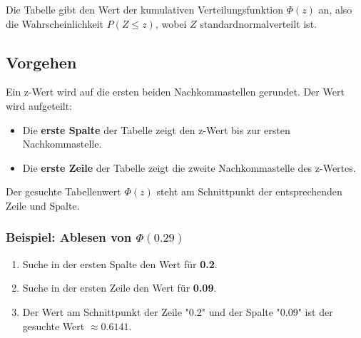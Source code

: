 Die Tabelle gibt den Wert der kumulativen Verteilungsfunktion \(\Phi(z)\) an, also die Wahrscheinlichkeit \(P(Z \le z)\), wobei \(Z\) standardnormalverteilt ist.

\subsection*{Vorgehen}
Ein z-Wert wird auf die ersten beiden Nachkommastellen gerundet. Der Wert wird aufgeteilt:
\begin{itemize}
    \item Die \textbf{erste Spalte} der Tabelle zeigt den z-Wert bis zur ersten Nachkommastelle.
    \item Die \textbf{erste Zeile} der Tabelle zeigt die zweite Nachkommastelle des z-Wertes.
\end{itemize}
Der gesuchte Tabellenwert \(\Phi(z)\) steht am Schnittpunkt der entsprechenden Zeile und Spalte.

\subsubsection*{Beispiel: Ablesen von \(\Phi(0.29)\)}
\begin{enumerate}
    \item Suche in der ersten Spalte den Wert für \textbf{0.2}.
    \item Suche in der ersten Zeile den Wert für \textbf{0.09}.
    \item Der Wert am Schnittpunkt der Zeile "0.2" und der Spalte "0.09" ist der gesuchte Wert \(\approx 0.6141\).
\end{enumerate}

\begin{figure}[h!]
\centering
{}
\end{figure}

